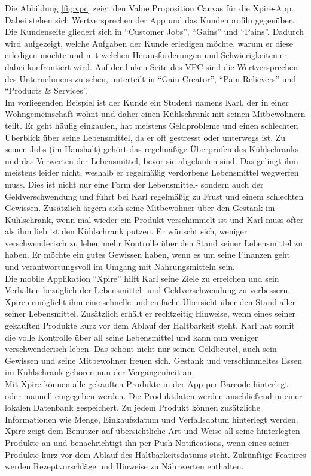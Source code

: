 Die Abbildung \ref{fig:vpc} zeigt den Value Proposition Canvas für die Xpire-App. Dabei stehen sich Wertversprechen der App und das Kundenprofiln gegenüber. Die Kundenseite gliedert sich in \enquote{Customer Jobs}, \enquote{Gains} und \enquote{Pains}. Dadurch wird aufgezeigt, welche Aufgaben der Kunde erledigen möchte, warum er diese erledigen möchte und mit welchen Herausforderungen und Schwierigkeiten er dabei konfrontiert wird. Auf der linken Seite des VPC sind die Wertversprechen des Unternehmens zu sehen, unterteilt in \enquote{Gain Creator}, \enquote{Pain Relievers} und \enquote{Products \& Services}.\\
Im vorliegenden Beispiel ist der Kunde ein Student namens Karl, der in einer Wohngemeinschaft wohnt und daher einen Kühlschrank mit seinen Mitbewohnern teilt. Er geht häufig einkaufen, hat meistens Geldprobleme und einen schlechten Überblick über seine Lebensmittel, da er oft gestresst oder unterwegs ist. Zu seinen Jobs (im Haushalt) gehört das regelmäßige Überprüfen des Kühlschranks und das Verwerten der Lebensmittel, bevor sie abgelaufen sind. Das gelingt ihm  meistens leider nicht, weshalb er regelmäßig verdorbene Lebensmittel wegwerfen muss. Dies ist nicht nur eine Form der Lebensmittel- sondern auch der Geldverschwendung und führt bei Karl regelmäßig zu Frust und einem schlechten Gewissen. Zusätzlich ärgern sich seine Mitbewohner über den Gestank im Kühlschrank, wenn mal wieder ein Produkt verschimmelt ist und Karl muss öfter als ihm lieb ist den Kühlschrank putzen. Er wünscht sich, weniger verschwenderisch zu leben mehr Kontrolle über den Stand seiner Lebensmittel zu haben. Er möchte ein gutes Gewissen haben, wenn es um seine Finanzen geht und verantwortungsvoll im Umgang mit Nahrungsmitteln sein.\\
Die mobile Applikation \enquote{Xpire} hilft Karl seine Ziele zu erreichen und sein Verhalten bezüglich der Lebensmittel- und Geldverschwendung zu verbessern. Xpire ermöglicht ihm eine schnelle und einfache Übersicht über den Stand aller seiner Lebensmittel. Zusätzlich erhält er rechtzeitig Hinweise, wenn eines seiner gekauften Produkte kurz vor dem Ablauf der Haltbarkeit steht. Karl hat somit die volle Kontrolle über all seine Lebensmittel und kann nun weniger verschwenderisch leben. Das schont nicht nur seinen Geldbeutel, auch sein Gewissen und seine Mitbewohner freuen sich. Gestank und verschimmeltes Essen im Kühlschrank gehören nun der Vergangenheit an.\\
Mit Xpire können alle gekauften Produkte in der App per Barcode hinterlegt oder manuell eingegeben werden. Die Produktdaten werden anschließend in einer lokalen Datenbank gespeichert. Zu jedem Produkt können zusätzliche Informationen wie Menge, Einkaufsdatum und Verfallsdatum hinterlegt werden. Xpire zeigt dem Benutzer auf übersichtliche Art und Weise all seine hinterlegten Produkte an und benachrichtigt ihn per Push-Notifications, wenn eines seiner Produkte kurz vor dem Ablauf des Haltbarkeitsdatums steht. Zukünftige Features werden Rezeptvorschläge und Hinweise zu Nährwerten enthalten. 


